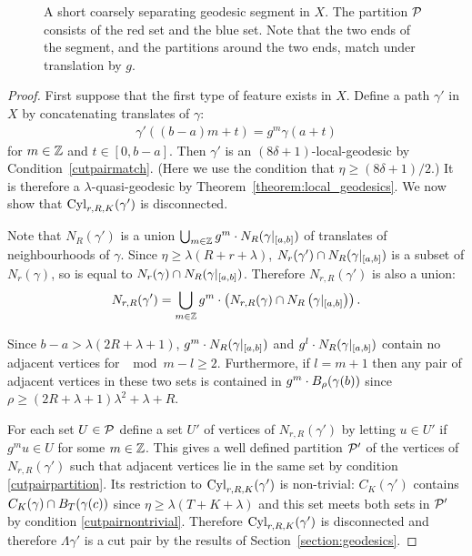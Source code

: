 \begin{figure}
  \begin{center}
    
  \end{center}
  \caption{
    \label{figure:pumping_lemma}
    A short coarsely separating geodesic segment in $X$. 
    The partition $\mathcal{P}$ consists of the red set and the blue set.
    Note that the two ends of the segment, and the partitions around the two ends, match under translation by $g$.
  }
\end{figure}

\begin{proof} 
  First suppose that the first type of feature exists in $X$.
  Define a path $\gamma'$ in $X$ by concatenating translates of $\gamma$:
  \begin{align} 
    \gamma'\left((b - a)m + t\right) = g^m\gamma(a + t)
  \end{align}
  for $m \in \mathbb{Z}$ and $t \in [0, b-a]$. 
  Then $\gamma'$ is an $(8\delta + 1)$-local-geodesic by Condition~\ref{cutpairmatch}.
  (Here we use the condition that $\eta \geq (8\delta + 1)/2$.) 
  It is therefore a $\lambda$-quasi-geodesic by Theorem~\ref{theorem:local_geodesics}. 
  We now show that $\operatorname{Cyl}_{r, R, K}(\gamma')$ is disconnected.

  Note that $N_R(\gamma')$ is a union $\bigcup_{m\in\mathbb{Z}} g^m\cdot N_R(\gamma\vert_{[a, b]})$ of translates of neighbourhoods of $\gamma$.
  Since $\eta \geq \lambda(R + r + \lambda)$, $N_r(\gamma') \cap N_R(\gamma\vert_{[a, b]})$ is a subset of $N_{r}(\gamma)$, so is equal to $N_r(\gamma) \cap N_R(\gamma\vert_{[a, b]})$.  
  Therefore $N_{r, R}(\gamma')$ is also a union:
  \begin{align} 
    N_{r, R}(\gamma') = \bigcup_{m \in \mathbb{Z}} g^m\cdot \left(N_{r, R}(\gamma) \cap N_R\left(\gamma\vert_{ [a,b]}\right)\right).
  \end{align}

  Since $b - a > \lambda(2R+\lambda+1)$, $g^m \cdot N_R(\gamma\vert_{[a, b]})$ and $g^l \cdot N_R(\gamma\vert_{[a, b]})$ contain no adjacent vertices for $\mod{m - l} \geq 2$. 
  Furthermore, if $l = m+1$ then any pair of adjacent vertices in these two sets is contained in $g^m\cdot B_{\rho}(\gamma(b))$ since $\rho \geq (2R + \lambda + 1)\lambda^2 + \lambda + R$.

  For each set $U \in \mathcal{P}$ define a set $U'$ of vertices of $N_{r, R}(\gamma')$ by letting $u \in U'$ if $g^m u \in U$ for some $m \in \mathbb{Z}$.
  This gives a well defined partition $\mathcal{P}'$ of the vertices of $N_{r, R}(\gamma')$ such that adjacent vertices lie in the same set by condition \ref{cutpairpartition}. 
  Its restriction to $\operatorname{Cyl}_{r, R, K}(\gamma')$ is non-trivial: $C_K(\gamma')$ contains $C_K(\gamma) \cap B_{T}(\gamma(c))$ since $\eta \geq \lambda(T + K + \lambda)$ and this set meets both sets in $\mathcal{P}'$ by condition \ref{cutpairnontrivial}. 
  Therefore $\operatorname{Cyl}_{r, R, K}(\gamma')$ is disconnected and therefore $\Lambda\gamma'$ is a cut pair by the results of Section~\ref{section:geodesics}.


\end{proof}

